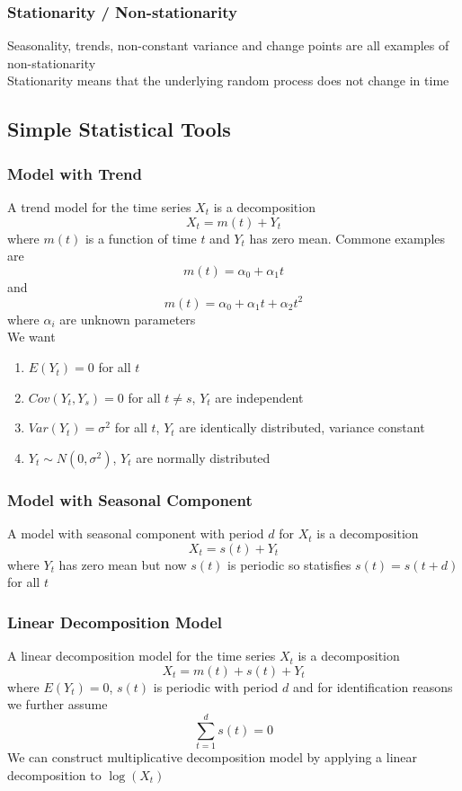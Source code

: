 \documentclass[11pt]{article}
\begin{document}
\subsubsection{Stationarity / Non-stationarity}
Seasonality, trends, non-constant variance and change points are all examples of non-stationarity \\
Stationarity means that the underlying random process does not change in time 
\subsection{Simple Statistical Tools}
\subsubsection{Model with Trend}
A trend model for the time series $X_t$ is a decomposition 
\[X_t = m(t) + Y_t\] 
where $m(t)$ is a function of time $t$ and $Y_t$ has zero mean. Commone examples are 
\[m(t) = \alpha_0 + \alpha_1 t\]
and 
\[m(t) = \alpha_0 + \alpha_1 t + \alpha_2 t^2\]
where $\alpha_i$ are unknown parameters \\
We want 
\begin{enumerate}
    \item $E(Y_t) = 0$ for all $t$
    \item $Cov(Y_t, Y_s) = 0$ for all $t \neq s$, $Y_t$ are independent
    \item $Var(Y_t) = \sigma^2$ for all $t$, $Y_t$ are identically distributed, variance constant 
    \item $Y_t\sim N(0, \sigma^2)$, $Y_t$ are normally distributed
\end{enumerate}
\subsubsection{Model with Seasonal Component}
A model with seasonal component with period $d$ for $X_t$ is a decomposition 
\[X_t = s(t) + Y_t\] 
where $Y_t$ has zero mean but now $s(t)$ is periodic so statisfies $s(t) = s(t+d)$ for all $t$ 
\subsubsection{Linear Decomposition Model}
A linear decomposition model for the time series $X_t$ is a decomposition 
\[X_t=m(t)+s(t)+Y_t\] 
where $E(Y_t)=0$, $s(t)$ is periodic with period $d$ and for identification reasons we further assume
\[\sum_{t=1}^{d}s(t)=0\]  
We can construct multiplicative decomposition model by applying a linear decomposition to $\log(X_t)$ 
\end{document}
